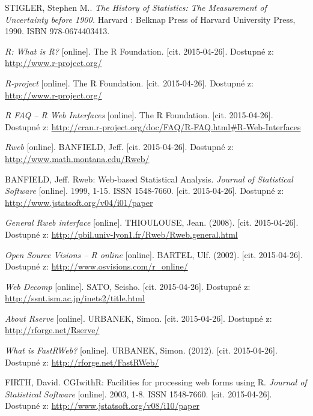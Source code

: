 \documentclass[thesis=B,czech]{FITthesis}[2012/06/26]
\begin{document}
\begin{thebibliography}{Per00}

STIGLER, Stephen M.. \emph{The History of Statistics: The Measurement of Uncertainty before 1900.} Harvard : Belknap Press of Harvard University Press, 1990. ISBN 978-0674403413. 
 
\emph{R: What is R?} [online]. The R Foundation. [cit. 2015-04-26]. Dostupné z:  \url{http://www.r-project.org/} 

\emph{R-project} [online]. The R Foundation. [cit. 2015-04-26]. Dostupné z: \url{http://www.r-project.org/} 

\emph{R FAQ – R Web Interfaces} [online]. The R Foundation. [cit. 2015-04-26]. Dostupné z: \url{http://cran.r-project.org/doc/FAQ/R-FAQ.html\#R-Web-Interfaces}

\emph{Rweb} [online]. BANFIELD, Jeff. [cit. 2015-04-26]. Dostupné z: \url{http://www.math.montana.edu/Rweb/} 

BANFIELD, Jeff. Rweb: Web-based Statistical Analysis. \emph{Journal of Statistical Software} [online]. 1999, 1-15. ISSN 1548-7660. [cit. 2015-04-26]. Dostupné z: \url{http://www.jstatsoft.org/v04/i01/paper} 

\emph{General Rweb interface} [online]. THIOULOUSE, Jean. (2008). [cit. 2015-04-26]. Dostupné z: \url{http://pbil.univ-lyon1.fr/Rweb/Rweb.general.html}

\emph{Open Source Visions – R online} [online]. BARTEL, Ulf. (2002). [cit. 2015-04-26]. Dostupné z: \url{http://www.osvisions.com/r\_online/} 

\emph{Web Decomp} [online]. SATO, Seisho. [cit. 2015-04-26]. Dostupné z: \url{http://ssnt.ism.ac.jp/inets2/title.html}

\emph{About Rserve} [online]. URBANEK, Simon. [cit. 2015-04-26]. Dostupné z: \url{http://rforge.net/Rserve/} 

\emph{What is FastRWeb?} [online]. URBANEK, Simon. (2012). [cit. 2015-04-26]. Dostupné z: \url{http://rforge.net/FastRWeb/}

FIRTH, David. CGIwithR: Facilities for processing web forms using R. \emph{Journal of Statistical Software} [online]. 2003, 1-8. ISSN 1548-7660. [cit. 2015-04-26]. Dostupné z: \url{http://www.jstatsoft.org/v08/i10/paper} 


\end{thebibliography}
\end{document}
